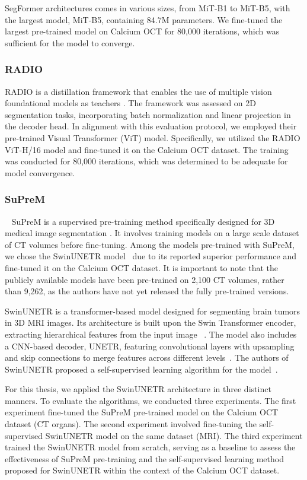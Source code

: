 \documentclass[a4paper,11pt,oneside]{report}
\begin{document}
SegFormer architectures comes in various sizes, from MiT-B1 to MiT-B5, with the largest model, MiT-B5, containing 84.7M parameters. We fine-tuned the largest pre-trained model on Calcium OCT for 80,000 iterations, which was sufficient for the model to converge.

\subsubsection{RADIO}
RADIO is a distillation framework that enables the use of multiple vision foundational models as teachers \cite{Ranzinger2024RADIO}. The framework was assessed on 2D segmentation tasks, incorporating batch normalization and linear projection in the decoder head. In alignment with this evaluation protocol, we employed their pre-trained Visual Transformer (ViT) model. Specifically, we utilized the RADIO ViT-H/16 model and fine-tuned it on the Calcium OCT dataset. The training was conducted for 80,000 iterations, which was determined to be adequate for model convergence.

\subsubsection{SuPreM}~\label{sec:design:suprem}
SuPreM is a supervised pre-training method specifically designed for 3D medical image segmentation \cite{Li2024}. It involves training models on a large scale dataset of CT volumes before fine-tuning. Among the models pre-trained with SuPreM, we chose the SwinUNETR model~\cite{Tang2022} due to its reported superior performance and fine-tuned it on the Calcium OCT dataset. It is important to note that the publicly available models have been pre-trained on 2,100 CT volumes, rather than 9,262, as the authors have not yet released the fully pre-trained versions.

SwinUNETR is a transformer-based model designed for segmenting brain tumors in 3D MRI images. Its architecture is built upon the Swin Transformer encoder, extracting hierarchical features from the input image ~\cite{Liu2021Swin}. The model also includes a CNN-based decoder, UNETR, featuring convolutional layers with upsampling and skip connections to merge features across different levels~\cite{Hatamizadeh2022}. The authors of SwinUNETR proposed a self-supervised learning algorithm for the model~\cite{Tang2022}. 

For this thesis, we applied the SwinUNETR architecture in three distinct manners. To evaluate the algorithms, we conducted three experiments. The first experiment fine-tuned the SuPreM pre-trained model on the Calcium OCT dataset (CT organs). The second experiment involved fine-tuning the self-supervised SwinUNETR model on the same dataset (MRI). The third experiment trained the SwinUNETR model from scratch, serving as a baseline to assess the effectiveness of SuPreM pre-training and the self-supervised learning method proposed for SwinUNETR within the context of the Calcium OCT dataset.
\end{document}
